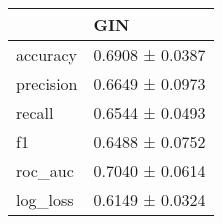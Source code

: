 \begin{tabular}{ll}
\toprule
 & GIN \\
\midrule
accuracy & 0.6908 ± 0.0387 \\
precision & 0.6649 ± 0.0973 \\
recall & 0.6544 ± 0.0493 \\
f1 & 0.6488 ± 0.0752 \\
roc_auc & 0.7040 ± 0.0614 \\
log_loss & 0.6149 ± 0.0324 \\
\bottomrule
\end{tabular}
